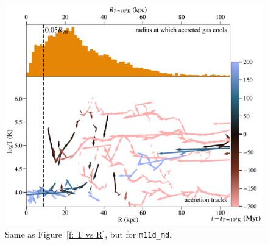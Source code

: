 \documentclass[fleqn,usenatbib]{mnras}
\begin{document}
\begin{figure}
    \centering
    \includegraphics[width=\columnwidth]{figures/tracks_m11d_md.pdf}
    \caption{
    Same as Figure~\ref{f: T vs R}, but for \texttt{m11d\_md}.
    }
    \label{f: T vs R m12b_md}
\end{figure}

\end{document}
